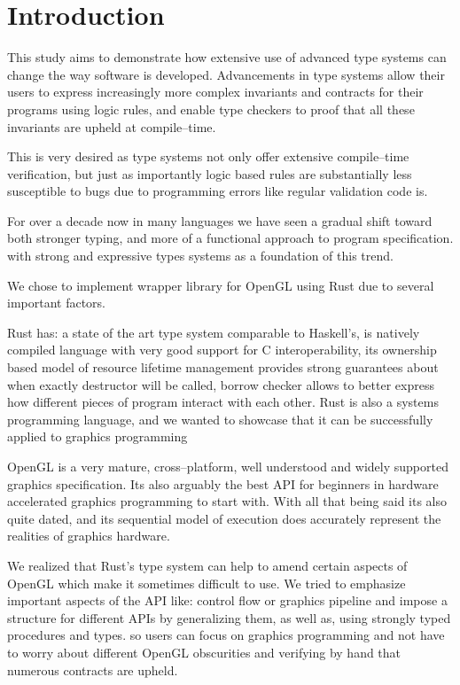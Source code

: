 \chapter*{Introduction}

This study aims to demonstrate how extensive use of advanced type systems can change the way software is developed.
Advancements in type systems allow their users to express increasingly more complex invariants and contracts for their programs using logic rules, 
and enable type checkers to proof that all these invariants are upheld at compile--time.

This is very desired as type systems not only offer extensive compile--time verification, but just as importantly logic based rules are substantially less susceptible to bugs
due to programming errors like regular validation code is.

For over a decade now in many languages we have seen a gradual shift toward both stronger typing, and more of a functional approach to program specification.
with strong and expressive types systems as a foundation of this trend.

We chose to implement wrapper library for OpenGL using Rust due to several important factors.

Rust has: a state of the art type system comparable to Haskell's, 
is natively compiled language with very good support for C interoperability,
its ownership based model of resource lifetime management provides strong guarantees about when exactly destructor will be called,
borrow checker allows to better express how different pieces of program interact with each other.
Rust is also a systems programming language, and we wanted to showcase that it can be successfully applied to graphics programming \cite{rustpage}

OpenGL is a very mature, cross--platform, well understood and widely supported graphics specification.
Its also arguably the best API for beginners in hardware accelerated graphics programming to start with.
With all that being said its also quite dated, and its sequential model of execution does accurately represent the realities of graphics hardware.

We realized that Rust's type system can help to amend certain aspects of OpenGL which make it sometimes difficult to use.
We tried to emphasize important aspects of the API like: control flow or graphics pipeline and 
impose a structure for different APIs by generalizing them, as well as, using strongly typed procedures and types.
so users can focus on graphics programming and not have to worry about different OpenGL obscurities and verifying by hand that 
numerous contracts are upheld.
